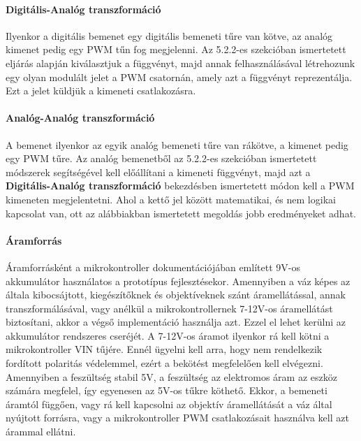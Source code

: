 \paragraph{Digitális-Analóg transzformáció}
Ilyenkor a digitális bemenet egy digitális bemeneti tűre van kötve, az analóg kimenet pedig egy PWM tűn fog megjelenni. Az 5.2.2-es szekcióban ismertetett eljárás alapján kiválasztjuk a függvényt, majd annak felhasználásával létrehozunk egy olyan modulált jelet a PWM csatornán, amely azt a függvényt reprezentálja. Ezt a jelet küldjük a kimeneti csatlakozásra.
\paragraph{Analóg-Analóg transzformáció}
A bemenet ilyenkor az egyik analóg bemeneti tűre van rákötve, a kimenet pedig egy PWM tűre. Az analóg bemenetből az 5.2.2-es szekcióban ismertetett módszerek segítségével kell előállítani a kimeneti függvényt, majd azt a \textbf{Digitális-Analóg transzformáció} bekezdésben ismertetett módon kell a PWM kimeneten megjelentetni. Ahol a kettő jel között matematikai, és nem logikai kapcsolat van, ott az alábbiakban ismertetett megoldás jobb eredményeket adhat.

\paragraph{Áramforrás}
Áramforrásként a  mikrokontroller dokumentációjában említett 9V-os akkumulátor használatos a prototípus fejlesztésekor. Amennyiben a váz képes az általa kibocsájtott, kiegészítőknek és objektíveknek szánt áramellátással, annak transzformálásával, vagy anélkül a mikrokontrollernek 7-12V-os\cite{arduino_aram} áramellátást biztosítani, akkor a végső implementáció használja azt. Ezzel el lehet kerülni az akkumulátor rendszeres cseréjét. A 7-12V-os áramot ilyenkor rá kell kötni a mikrokontroller VIN tűjére. Ennél ügyelni kell arra, hogy nem rendelkezik fordított polaritás védelemmel, ezért a bekötést megfelelően kell elvégezni.\cite{arduino_docs} Amennyiben a feszültség stabil 5V, a feszültség az elektromos áram az eszköz számára megfelel, így egyenesen az 5V-os tűkre köthető. Ekkor, a bemeneti áramtól függően, vagy rá kell kapcsolni az objektív áramellátását a váz által nyújtott forrásra, vagy a mikrokontroller PWM csatlakozásait használva kell azt árammal ellátni.

